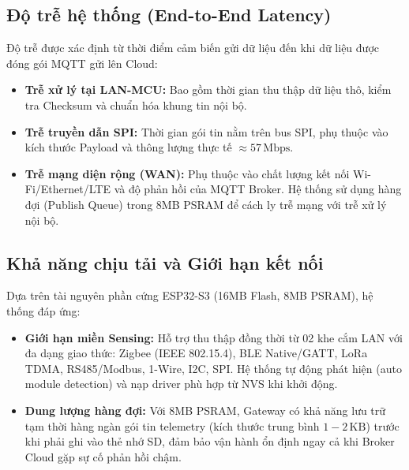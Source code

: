 \subsection{Độ trễ hệ thống (End-to-End Latency)}
Độ trễ được xác định từ thời điểm cảm biến gửi dữ liệu đến khi dữ liệu được đóng gói MQTT gửi lên Cloud:
\begin{itemize}
    \item \textbf{Trễ xử lý tại LAN-MCU:} Bao gồm thời gian thu thập dữ liệu thô, kiểm tra Checksum và chuẩn hóa khung tin nội bộ.
    \item \textbf{Trễ truyền dẫn SPI:} Thời gian gói tin nằm trên bus SPI, phụ thuộc vào kích thước Payload và thông lượng thực tế $\approx 57\,\text{Mbps}$.
    \item \textbf{Trễ mạng diện rộng (WAN):} Phụ thuộc vào chất lượng kết nối Wi-Fi/Ethernet/LTE và độ phản hồi của MQTT Broker. Hệ thống sử dụng hàng đợi (Publish Queue) trong 8MB PSRAM để cách ly trễ mạng với trễ xử lý nội bộ.
\end{itemize}

\subsection{Khả năng chịu tải và Giới hạn kết nối}
Dựa trên tài nguyên phần cứng ESP32-S3 (16MB Flash, 8MB PSRAM), hệ thống đáp ứng:
\begin{itemize}
    \item \textbf{Giới hạn miền Sensing:} Hỗ trợ thu thập đồng thời từ 02 khe cắm LAN với đa dạng giao thức: Zigbee (IEEE 802.15.4), BLE Native/GATT, LoRa TDMA, RS485/Modbus, 1-Wire, I2C, SPI. Hệ thống tự động phát hiện (auto module detection) và nạp driver phù hợp từ NVS khi khởi động.
    \item \textbf{Dung lượng hàng đợi:} Với 8MB PSRAM, Gateway có khả năng lưu trữ tạm thời hàng ngàn gói tin telemetry (kích thước trung bình $1-2 \, \text{KB}$) trước khi phải ghi vào thẻ nhớ SD, đảm bảo vận hành ổn định ngay cả khi Broker Cloud gặp sự cố phản hồi chậm.
\end{itemize}